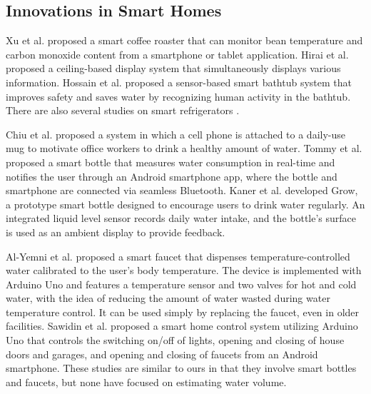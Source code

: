 \documentclass[sigconf,authordraft]{acmart}
\begin{document}
\subsection{Innovations in Smart Homes}
Xu et al. \cite{smart_home1} proposed a smart coffee roaster that can monitor bean temperature and carbon monoxide content from a smartphone or tablet application.
Hirai et al. \cite{smart_home2} proposed a ceiling-based display system that simultaneously displays various information.
Hossain et al. \cite{smart_home3} proposed a sensor-based smart bathtub system that improves safety and saves water by recognizing human activity in the bathtub.
There are also several studies on smart refrigerators \cite{smart_refrigerator1, smart_refrigerator2, smart_refrigerator3, smart_refrigerator4}. \par

Chiu et al. \cite{PlayfulBottle} proposed a system in which a cell phone is attached to a daily-use mug to motivate office workers to drink a healthy amount of water.
Tommy et al. \cite{SmartBottle} proposed a smart bottle that measures water consumption in real-time and notifies the user through an Android smartphone app, where the bottle and smartphone are connected via seamless Bluetooth.
Kaner et al. \cite{GROW} developed Grow, a prototype smart bottle designed to encourage users to drink water regularly. An integrated liquid level sensor records daily water intake, and the bottle's surface is used as an ambient display to provide feedback.\par

Al-Yemni et al. \cite{smart_faucet2} proposed a smart faucet that dispenses temperature-controlled water calibrated to the user’s body temperature. The device is implemented with Arduino Uno and features a temperature sensor and two valves for hot and cold water, with the idea of reducing the amount of water wasted during water temperature control. It can be used simply by replacing the faucet, even in older facilities.
Sawidin et al. \cite{smart_faucet3} proposed a smart home control system utilizing Arduino Uno that controls the switching on/off of lights, opening and closing of house doors and garages, and opening and closing of faucets from an Android smartphone.
These studies are similar to ours in that they involve smart bottles and faucets, but none have focused on estimating water volume.


\end{document}

